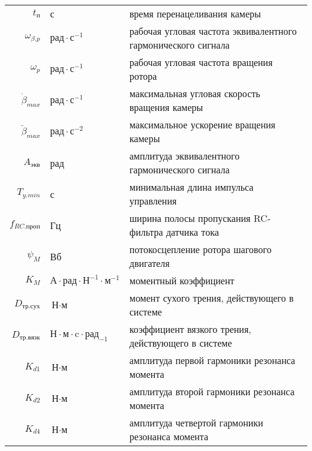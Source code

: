 \begin{table}[ht!]
\begin{tabular}{rll}
    $t_\text{п}$        & с & время перенацеливания камеры \\

    $\omega_{\beta.p}$  & $ \text{рад} \cdot \text{с}^{-1} $ & рабочая угловая
                            частота эквивалентного гармонического сигнала \\

    $\omega_{p}$        & $ \text{рад} \cdot \text{с}^{-1} $ & рабочая угловая
                            частота вращения ротора \\

    $\dot{\beta}_{max}$  & $\text{рад} \cdot \text{с}^{-1}$ & максимальная угловая скорость вращения камеры \\

    $\ddot{\beta}_{max}$ & $ \text{рад} \cdot \text{с}^{-2} $ & максимальное ускорение вращения камеры \\

    $A_{\text{экв}}$     & рад & амплитуда эквивалентного гармонического сигнала \\

    $T_{y.min}$          & с & минимальная длина импульса управления \\

    $f_{RC.\text{проп}}$ & Гц & ширина полосы пропускания RC-фильтра датчика тока \\

    $\psi_{M}$           & Вб & потокосцепление ротора шагового двигателя \\

    $K_{M}$              & $\text{А} \cdot \text{рад} \cdot \text{Н}^{-1} \cdot \text{м}^{-1}$ & моментный коэффициент \\

    $D_{\text{тр.сух}}$  & $\text{Н} \cdot \text{м}$ & момент сухого трения, действующего в системе \\

    $D_{\text{тр.вязк}}$  & $\text{Н} \cdot \text{м} \cdot \text{c} \cdot \text{рад}_{-1}$ & коэффициент вязкого трения, действующего в системе \\

    $K_{d1}$             & $\text{Н} \cdot \text{м}$ & амплитуда первой гармоники резонанса момента \\

    $K_{d2}$             & $\text{Н} \cdot \text{м}$ & амплитуда второй гармоники резонанса момента \\

    $K_{d4}$             & $\text{Н} \cdot \text{м}$ & амплитуда четвертой гармоники резонанса момента \\


\end{tabular}
\end{table}
